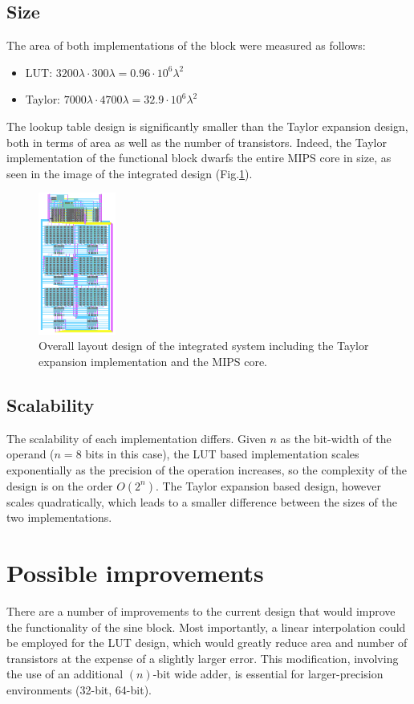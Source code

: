 \documentclass[10pt,journal]{IEEEtran}
\begin{document}
\subsection{Size}
The area of both implementations of the block were measured as follows:
\begin{itemize}
	\item LUT: $3200 \lambda \cdot 300 \lambda = 0.96 \cdot 10^6 \lambda^2$
	\item Taylor: $7000 \lambda \cdot 4700\lambda = 32.9 \cdot 10^6 \lambda^2$
\end{itemize}
The lookup table design is significantly smaller than the Taylor expansion design, both in terms of area as well as the number of transistors. Indeed, the Taylor implementation of the functional block dwarfs the entire MIPS core in size, as seen in the image of the integrated design (Fig.\ref{taylor_global}).

\begin{figure}[h]
\centering
\includegraphics[width=1in]{taylor_global.png}
\caption{Overall layout design of the integrated system including the Taylor expansion implementation and the MIPS core.}
\label{taylor_global}
\end{figure}

\subsection{Scalability}
The scalability of each implementation differs. Given $n$ as the bit-width of the operand ($n = 8$ bits in this case), the LUT based implementation scales exponentially as the precision of the operation increases, so the complexity of the design is on the order $O(2^n)$. The Taylor expansion based design, however scales quadratically, which leads to a smaller difference between the sizes of the two implementations.

\section{Possible improvements}
There are a number of improvements to the current design that would improve the functionality of the sine block. Most importantly, a linear interpolation could be employed for the LUT design, which would greatly reduce area and number of transistors at the expense of a slightly larger error. This modification, involving the use of an additional $(n)$-bit wide adder, is essential for larger-precision environments (32-bit, 64-bit).
\end{document}
